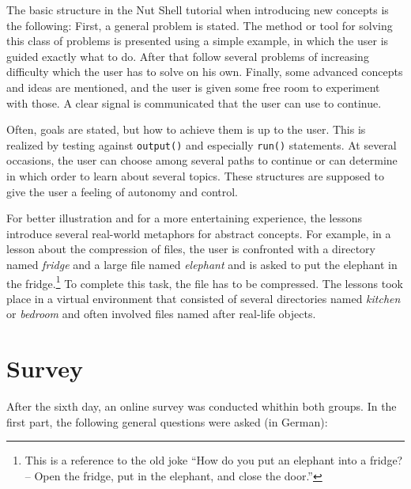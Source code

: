 \documentclass[paper=a4,twoside,abstract=on,cleardoublepage=empty,numbers=noenddot,toc=bib,12pt,appendixprefix=true]{scrreprt}
\begin{document}
The basic structure in the Nut Shell tutorial when introducing new concepts is the following: First, a general problem is stated. The method or tool for solving this class of problems is presented using a simple example, in which the user is guided exactly what to do. After that follow several problems of increasing difficulty which the user has to solve on his own. Finally, some advanced concepts and ideas are mentioned, and the user is given some free room to experiment with those. A clear signal is communicated that the user can use to continue.

Often, goals are stated, but how to achieve them is up to the user. This is realized by testing against \texttt{output()} and especially \texttt{run()} statements. At several occasions, the user can choose among several paths to continue or can determine in which order to learn about several topics. These structures are supposed to give the user a feeling of autonomy and control.

For better illustration and for a more entertaining experience, the lessons introduce several real-world metaphors for abstract concepts. For example, in a lesson about the compression of files, the user is confronted with a directory named \textit{fridge} and a large file named \textit{elephant} and is asked to put the elephant in the fridge.\footnote{This is a reference to the old joke “How do you put an elephant into a fridge? -- Open the fridge, put in the elephant, and close the door.”} To complete this task, the file has to be compressed. The lessons took place in a virtual environment that consisted of several directories named \emph{kitchen} or \emph{bedroom} and often involved files named after real-life objects.

\section{Survey}

After the sixth day, an online survey was conducted whithin both groups. In the first part, the following general questions were asked (in German):
\end{document}
